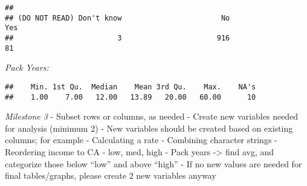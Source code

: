 \documentclass[
]{article}
\newenvironment{Shaded}{\begin{snugshade}}{\end{snugshade}}
\newcommand{\CommentTok}[1]{\textcolor[rgb]{0.56,0.35,0.01}{\textit{#1}}}
\newcommand{\FunctionTok}[1]{\textcolor[rgb]{0.00,0.00,0.00}{#1}}
\newcommand{\NormalTok}[1]{#1}
\newcommand{\SpecialCharTok}[1]{\textcolor[rgb]{0.00,0.00,0.00}{#1}}
\begin{document}
\begin{verbatim}
## 
## (DO NOT READ) Don't know                       No                      Yes 
##                        3                      916                       81
\end{verbatim}

\emph{Pack Years:}

\begin{Shaded}
\end{Shaded}

\begin{verbatim}
##    Min. 1st Qu.  Median    Mean 3rd Qu.    Max.    NA's 
##    1.00    7.00   12.00   13.89   20.00   60.00      10
\end{verbatim}

\emph{Milestone 3} - Subset rows or columns, as needed - Create new
variables needed for analysis (minimum 2) - New variables should be
created based on existing columns; for example - Calculating a rate -
Combining character strings - Reordering income to CA - low, med, high -
Pack years -\textgreater{} find avg, and categorize those below ``low''
and above ``high'' - If no new values are needed for final
tables/graphs, please create 2 new variables anyway
\end{document}
